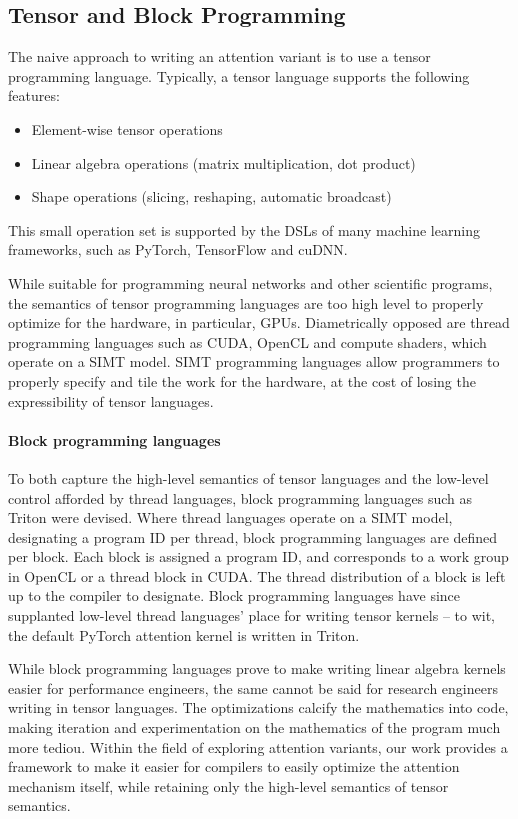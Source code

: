 \documentclass[review, anonymous, acmsmall]{acmart}
\begin{document}
\subsection{Tensor and Block Programming}

The naive approach to writing an attention variant is to use a tensor programming language. Typically, a tensor language supports the following features:
\begin{itemize}
  \item Element-wise tensor operations
  \item Linear algebra operations (matrix multiplication, dot product)
  \item Shape operations (slicing, reshaping, automatic broadcast)
\end{itemize}
This small operation set is supported by the DSLs of many machine learning frameworks, such as PyTorch, TensorFlow and cuDNN.

While suitable for programming neural networks and other scientific programs, the semantics of tensor programming languages are too high level to properly optimize for the hardware, in particular, GPUs. Diametrically opposed are thread programming languages such as CUDA, OpenCL and compute shaders, which operate on a SIMT model. SIMT programming languages allow programmers to properly specify and tile the work for the hardware, at the cost of losing the expressibility of tensor languages. 

\paragraph{Block programming languages} To both capture the high-level semantics of tensor languages and the low-level control afforded by thread languages, block programming languages such as Triton were devised. Where thread languages operate on a SIMT model, designating a program ID per thread, block programming languages are defined per block. Each block is assigned a program ID, and corresponds to a work group in OpenCL or a thread block in CUDA. The thread distribution of a block is left up to the compiler to designate. Block programming languages have since supplanted low-level thread languages' place for writing tensor kernels -- to wit, the default PyTorch attention kernel is written in Triton.

While block programming languages prove to make writing linear algebra kernels easier for performance engineers, the same cannot be said for research engineers writing in tensor languages. The optimizations calcify the mathematics into code, making iteration and experimentation on the mathematics of the program much more tediou. Within the field of exploring attention variants, our work provides a framework to make it easier for compilers to easily optimize the attention mechanism itself, while retaining only the high-level semantics of tensor semantics. 
\end{document}
